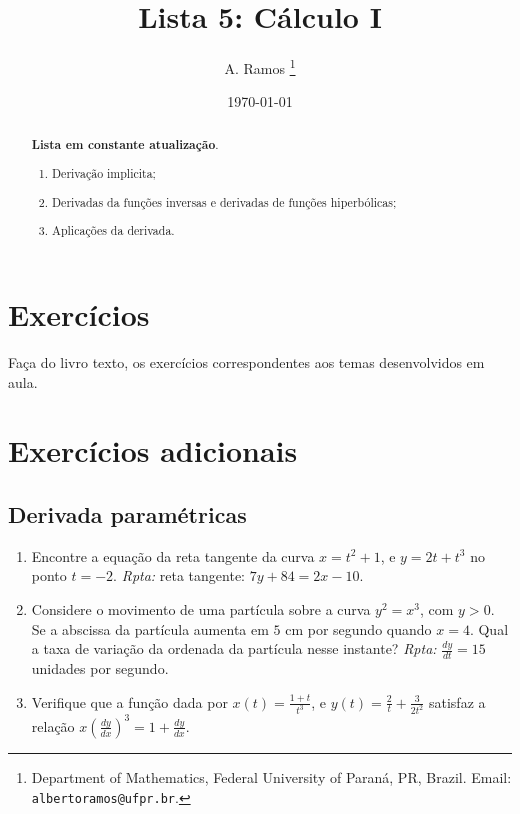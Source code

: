 \documentclass[latin,20pt]{article}
\begin{document}
\title{Lista 5: Cálculo I }
 
\author{
A. Ramos \thanks{Department of Mathematics,
    Federal University of Paraná, PR, Brazil.
    Email: {\tt albertoramos@ufpr.br}.}
}

\date{\today}
 
\maketitle

\begin{abstract}
{\bf Lista em constante atualização}.
 \begin{enumerate}
 \item Derivação implicita;
 \item Derivadas da funções inversas e derivadas de funções hiperbólicas; 
 \item Aplicações da derivada.  
 \end{enumerate}
\end{abstract}

 
  \section{Exercícios}   
 
 Faça do livro texto, os exercícios correspondentes aos temas desenvolvidos em aula. 
  
  \section{Exercícios adicionais}
    \subsection{Derivada paramétricas}
     \begin{enumerate}
     \item Encontre a equação da reta tangente da curva $x=t^{2}+1$, e 
     $y=2t+t^{3}$ no ponto $t=-2$. {\it Rpta:} reta tangente: $7y+84=2x-10$.
     \item Considere o movimento de uma partícula sobre a curva 
     $y^{2}=x^{3}$, com $y>0$. Se a abscissa da partícula aumenta em $5$ cm por segundo quando $x=4$. Qual a taxa de variação da ordenada da partícula nesse instante? {\it Rpta: } $\frac{dy}{dt}=15$ unidades por segundo.
     \item Verifique que a função dada por 
     $x(t)=\frac{1+t}{t^{3}}$, 
     e $y(t)=\frac{2}{t}+\frac{3}{2t^2}$ satisfaz a relação 
     $x (\frac{dy}{dx})^{3}=1+\frac{dy}{dx}$.
     \end{enumerate}
\end{document}
